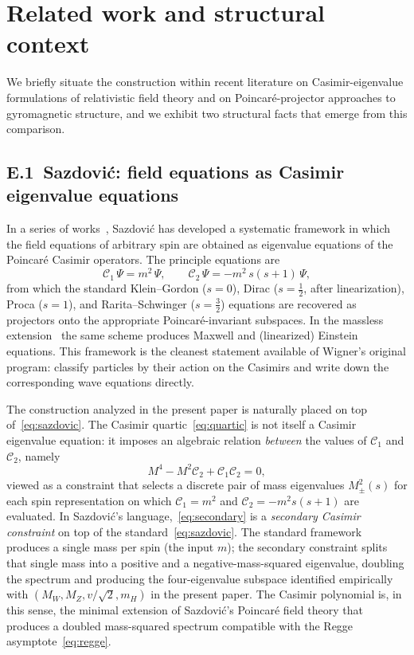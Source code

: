 \documentclass[twocolumn,aps,prd,floatfix,nofootinbib,superscriptaddress,10pt]{article}
\newcommand{\MW}{M_W}
\newcommand{\MZ}{M_Z}
\newcommand{\mH}{m_H}
\newcommand{\C}{\mathcal{C}}
\begin{document}
\section{Related work and structural context}
\label{app:related}

We briefly situate the construction within recent literature on Casimir-eigenvalue formulations of relativistic field theory and on Poincar\'e-projector approaches to gyromagnetic structure, and we exhibit two structural facts that emerge from this comparison.

\subsection*{E.1\, Sazdovi\'c: field equations as Casimir eigenvalue equations}

In a series of works~\cite{Sazdovic2024a,Sazdovic2024b,Sazdovic2024c}, Sazdovi\'c has developed a systematic framework in which the field equations of arbitrary spin are obtained as eigenvalue equations of the Poincar\'e Casimir operators. The principle equations are
\begin{equation}
\C_1\,\Psi = m^2\,\Psi,\qquad \C_2\,\Psi = -m^2\,s(s+1)\,\Psi,
\label{eq:sazdovic}
\end{equation}
from which the standard Klein--Gordon ($s=0$), Dirac ($s=\tfrac12$, after linearization), Proca ($s=1$), and Rarita--Schwinger ($s=\tfrac32$) equations are recovered as projectors onto the appropriate Poincar\'e-invariant subspaces. In the massless extension~\cite{Sazdovic2024b} the same scheme produces Maxwell and (linearized) Einstein equations. This framework is the cleanest statement available of Wigner's original program: classify particles by their action on the Casimirs and write down the corresponding wave equations directly.

The construction analyzed in the present paper is naturally placed on top of~\eqref{eq:sazdovic}. The Casimir quartic~\eqref{eq:quartic} is not itself a Casimir eigenvalue equation: it imposes an algebraic relation {\em between} the values of $\C_1$ and $\C_2$, namely
\begin{equation}
M^4 - M^2\C_2 + \C_1\C_2 = 0,
\label{eq:secondary}
\end{equation}
viewed as a constraint that selects a discrete pair of mass eigenvalues $M^2_\pm(s)$ for each spin representation on which $\C_1=m^2$ and $\C_2=-m^2s(s+1)$ are evaluated. In Sazdovi\'c's language,~\eqref{eq:secondary} is a {\em secondary Casimir constraint} on top of the standard~\eqref{eq:sazdovic}. The standard framework produces a single mass per spin (the input $m$); the secondary constraint splits that single mass into a positive and a negative-mass-squared eigenvalue, doubling the spectrum and producing the four-eigenvalue subspace identified empirically with $(\MW,\MZ,v/\sqrt2,\mH)$ in the present paper. The Casimir polynomial is, in this sense, the minimal extension of Sazdovi\'c's Poincar\'e field theory that produces a doubled mass-squared spectrum compatible with the Regge asymptote~\eqref{eq:regge}.
\end{document}
